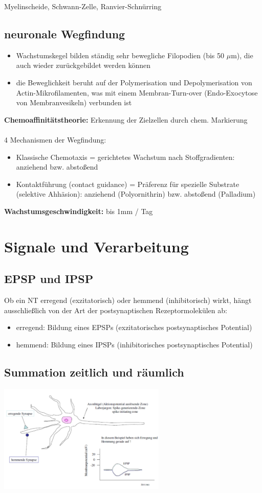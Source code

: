 \documentclass[12pt,a4paper]{article}
\begin{document}
Myelinscheide, Schwann-Zelle, Ranvier-Schnürring

\subsection{neuronale Wegfindung}
\begin{itemize}
	\item Wachstumskegel bilden ständig sehr bewegliche Filopodien (bis 50 $\mu$m), die auch wieder zurückgebildet werden können
	\item die Beweglichkeit beruht auf der Polymerisation und Depolymerisation von Actin-Mikrofilamenten, was mit einem Membran-Turn-over (Endo-Exocytose von Membranvesikeln) verbunden ist
\end{itemize}

\textbf{Chemoaffinitätstheorie:} Erkennung der Zielzellen durch chem. Markierung\\\\
4 Mechanismen der Wegfindung:
\begin{itemize}
	\item Klassische Chemotaxis = gerichtetes Wachstum nach Stoffgradienten: anziehend bzw. abstoßend
	\item Kontaktführung (contact guidance) = Präferenz für spezielle Substrate (selektive Ahhäsion): anziehend (Polyornithrin) bzw. abstoßend (Palladium)
\end{itemize}

\textbf{Wachstumsgeschwindigkeit:} bis 1mm / Tag

\section{Signale und Verarbeitung}

\subsection{EPSP und IPSP}
Ob ein NT erregend (exzitatorisch) oder hemmend (inhibitorisch) wirkt, hängt ausschließlich von der Art der postsynaptischen Rezeptormolekülen ab:
\begin{itemize}
	\item erregend: Bildung eines EPSPs (exzitatorisches postsynaptisches Potential)
	\item hemmend: Bildung eines IPSPs (inhibitorisches postsynaptisches
Potential)
\end{itemize}

\subsection{Summation zeitlich und räumlich}
\includegraphics[width=0.6\textwidth]{tmp_pix/calculation.png}
\end{document}
